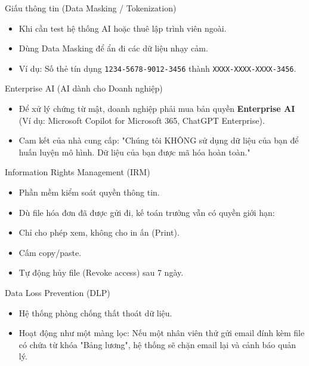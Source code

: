 \documentclass[aspectratio=169]{beamer}
\begin{document}
\begin{frame}{Giấu thông tin (Data Masking / Tokenization)}
    \begin{itemize}
        \item Khi cần test hệ thống AI hoặc thuê lập trình viên ngoài.
        \item Dùng Data Masking để ẩn đi các dữ liệu nhạy cảm.
        \item Ví dụ: Số thẻ tín dụng \texttt{1234-5678-9012-3456} thành \texttt{XXXX-XXXX-XXXX-3456}.
    \end{itemize}
\end{frame}


\begin{frame}{Enterprise AI (AI dành cho Doanh nghiệp)}
    \begin{itemize}
        \item Để xử lý chứng từ mật, doanh nghiệp phải mua bản quyền \textbf{Enterprise AI} (Ví dụ: Microsoft Copilot for Microsoft 365, ChatGPT Enterprise).
        \item Cam kết của nhà cung cấp: "Chúng tôi KHÔNG sử dụng dữ liệu của bạn để huấn luyện mô hình. Dữ liệu của bạn được mã hóa hoàn toàn."
    \end{itemize}
\end{frame}


\begin{frame}{Information Rights Management (IRM)}
    \begin{itemize}
        \item Phần mềm kiểm soát quyền thông tin.
        \item Dù file hóa đơn đã được gửi đi, kế toán trưởng vẫn có quyền giới hạn:
        \item Chỉ cho phép xem, không cho in ấn (Print).
        \item Cấm copy/paste.
        \item Tự động hủy file (Revoke access) sau 7 ngày.
    \end{itemize}
\end{frame}


\begin{frame}{Data Loss Prevention (DLP)}
    \begin{itemize}
        \item Hệ thống phòng chống thất thoát dữ liệu.
        \item Hoạt động như một màng lọc: Nếu một nhân viên thử gửi email đính kèm file có chứa từ khóa "Bảng lương", hệ thống sẽ chặn email lại và cảnh báo quản lý.
    \end{itemize}
\end{frame}
\end{document}
